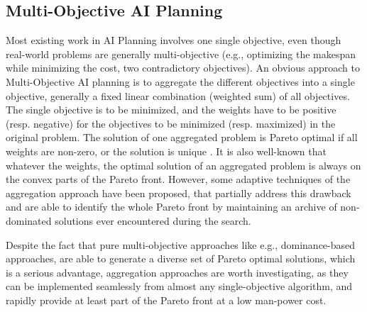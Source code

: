 \documentclass{llncs}
\begin{document}

\subsection{Multi-Objective AI Planning}
\label{sec:multiobjectivePlanning}
Most existing work in AI Planning involves one single objective, even though real-world problems are generally multi-objective (e.g., optimizing the makespan while minimizing the cost, two contradictory objectives). 
An obvious approach to Multi-Objective AI planning is to aggregate the different objectives into a single objective, generally a fixed linear combination (weighted sum) of all objectives. The single objective is to be minimized, and the weights have to be positive (resp. negative) for the objectives to be minimized (resp. maximized) in the original problem. 
The solution of one aggregated problem is Pareto optimal if all weights are non-zero, or the solution is unique \cite{miettinen1999nonlinear}. It is also well-known that whatever the weights, the optimal solution of an aggregated problem is always on the convex parts of the Pareto front. 
However, some adaptive techniques of the aggregation approach have been proposed, that partially address this drawback \cite{adaptingWeightsEMO01} and are able to identify the whole Pareto front by maintaining an archive of non-dominated solutions ever encountered during the search. 

Despite the fact that pure multi-objective approaches like e.g., dominance-based approaches, are able to generate a diverse set of Pareto optimal solutions, which is a serious advantage, aggregation approaches are worth investigating, as they can be implemented seamlessly from almost any single-objective algorithm, and rapidly provide at least part of the Pareto front at a low man-power cost. 
\end{document}
